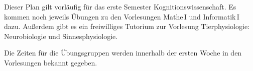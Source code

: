 Dieser Plan gilt vorläufig für das erste Semester Kognitionswissenschaft. 
Es kommen noch jeweils Übungen zu den Vorlesungen Mathe\,I und Informatik\,I %
dazu.
Außerdem gibt es ein freiwilliges Tutorium zur Vorlesung Tierphysiologie: Neurobiologie und Sinnesphysiologie. %

Die Zeiten für die Übungsgruppen werden innerhalb der ersten Woche in den Vorlesungen bekannt gegeben.
\\ \\